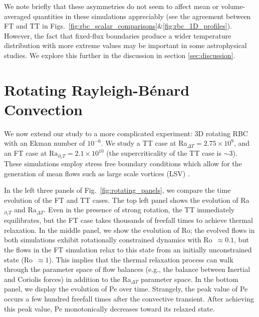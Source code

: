 \documentclass[aps, pre, onecolumn, nofootinbib, notitlepage, groupedaddress, amsfonts, amssymb, amsmath, longbibliography, superscriptaddress]{revtex4-1}
\newcommand{\RB}{Rayleigh-B\'{e}nard }
\begin{document}
We note briefly that these asymmetries do not seem to affect mean or volume-averaged quantities in these simulations appreciably (see the agreement between FT and TT in Figs.~\ref{fig:rbc_scalar_comparisons}\&\ref{fig:rbc_1D_profiles}).
However, the fact that fixed-flux boundaries produce a wider temperature distribution with more extreme values may be important in some astrophysical studies.
We explore this further in the discussion in section \ref{sec:discussion}.





\section{Rotating \RB Convection}
\label{sec:rotating_results}

We now extend our study to a more complicated experiment: 3D rotating RBC with an Ekman number of $10^{-6}$.
We study a TT case at Ra$_{\Delta T} = 2.75\times 10^9$, and an FT case at $\text{Ra}_{\partial_z T} = 2.1 \times 10^{10}$ (the supercriticality of the TT case is $\sim 3$).
These simulations employ stress free boundary conditions which allow for the generation of mean flows such as large scale vortices (LSV) \cite{couston&all2019}.

In the left three panels of Fig.~\ref{fig:rotating_panels}, we compare the time evolution of the FT and TT cases.
The top left panel shows the evolution of Ra$_{\partial_z T}$ and Ra$_{\Delta T}$.
Even in the presence of strong rotation, the TT immediately equilibrates, but the FT case takes thousands of freefall times to achieve thermal relaxation.
In the middle panel, we show the evolution of Ro; the evolved flows in both simulations exhibit rotationally constrained dynamics with Ro $\,\approx 0.1$, but the flows in the FT simulation relax to this state from an initially unconstrained state (Ro $\,\approx 1$).
This implies that the thermal relaxation process can walk through the parameter space of flow balances (e.g., the balance between Inertial and Coriolis forces) in addition to the Ra$_{\Delta T}$ parameter space.
In the bottom panel, we display the evolution of Pe over time.
Strangely, the peak value of Pe occurs a few hundred freefall times after the convective transient.
After achieving this peak value, Pe monotonically decreases toward its relaxed state.
\end{document}
